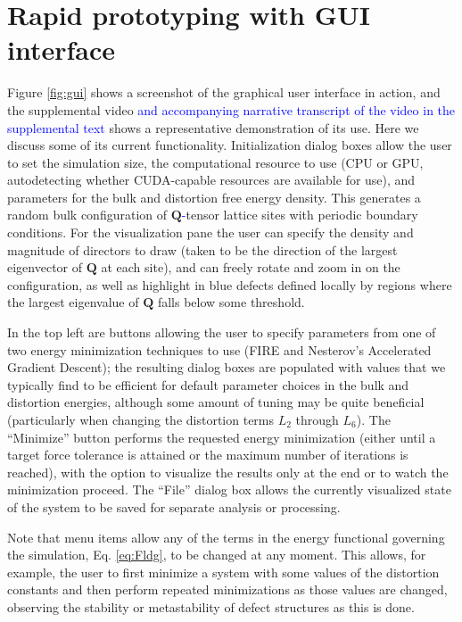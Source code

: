 \documentclass[utf8]{frontiersFPHY} %
\newcommand{\DAB}[1]{\textcolor{blue}{#1}}
\newcommand{\DMS}[1]{\textcolor{blue}{#1}}
\newcommand{\Q}{\mathbf{Q}}
\begin{document}
\section{Rapid prototyping with GUI interface} \label{sec: GUI}
Figure \ref{fig:gui} shows a screenshot of the graphical user interface in action, and the supplemental video \DMS{and accompanying narrative transcript of the video in the supplemental text} shows a representative demonstration of its use. Here we discuss some of its current functionality. Initialization dialog boxes %
 allow the user to set the simulation size, the computational resource to use (CPU or GPU, autodetecting whether CUDA-capable resources are available for use), and parameters for the bulk and distortion free energy density. This generates a random bulk configuration of $\Q$\DAB{-}tensor lattice sites with periodic boundary conditions. For the visualization pane the user can specify the density and magnitude of directors to draw (taken to be the direction of the largest eigenvector of $\Q$ at each site), and can freely rotate and zoom in on the configuration, as well as highlight in blue defects defined locally by regions where the largest eigenvalue of $\Q$ falls below some threshold.

In the top left are buttons allowing the user to specify parameters from one of two energy minimization techniques to use (FIRE and Nesterov's Accelerated Gradient Descent); the resulting dialog boxes are populated with values that we typically find to be efficient for default parameter choices in the bulk and distortion energies, although some amount of tuning may be quite beneficial (particularly when changing the distortion terms $L_2$ through $L_6$). The ``Minimize'' button performs the requested energy minimization (either until a target force tolerance is attained or the maximum number of iterations is reached), with the option to visualize the results only at the end or to watch the minimization proceed. The ``File'' dialog box allows the currently visualized state of the system to be saved for separate analysis or processing.

Note that menu items allow any of the terms in the energy functional governing the simulation, Eq. \ref{eq:Fldg}, to be changed at any moment. This allows, for example, the user to first minimize a system with some values of the distortion constants and then perform repeated minimizations as those values are changed, observing the stability or metastability of defect structures as this is done.
\end{document}
